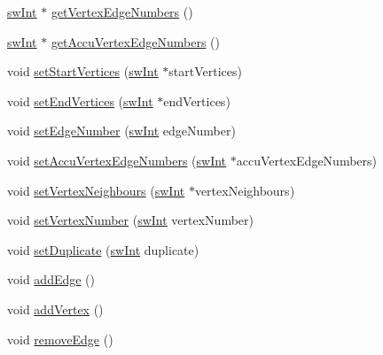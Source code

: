 \begin{DoxyCompactItemize}
\item 
\mbox{\hyperlink{include_2swMacro_8h_a113cf5f6b5377cdf3fac6aa4e443e9aa}{sw\+Int}} $\ast$ \mbox{\hyperlink{classUNAT_1_1Topology_a6838e39b330fa60923fb44e7f47a468d}{get\+Vertex\+Edge\+Numbers}} ()
\item 
\mbox{\hyperlink{include_2swMacro_8h_a113cf5f6b5377cdf3fac6aa4e443e9aa}{sw\+Int}} $\ast$ \mbox{\hyperlink{classUNAT_1_1Topology_a3d3981abcf81d997aa4631014eb4643e}{get\+Accu\+Vertex\+Edge\+Numbers}} ()
\item 
void \mbox{\hyperlink{classUNAT_1_1Topology_a59740da48119b1fe9cbc08ec61edd1c2}{set\+Start\+Vertices}} (\mbox{\hyperlink{include_2swMacro_8h_a113cf5f6b5377cdf3fac6aa4e443e9aa}{sw\+Int}} $\ast$start\+Vertices)
\item 
void \mbox{\hyperlink{classUNAT_1_1Topology_a238cee750b0467fe8d479b88f4cd2399}{set\+End\+Vertices}} (\mbox{\hyperlink{include_2swMacro_8h_a113cf5f6b5377cdf3fac6aa4e443e9aa}{sw\+Int}} $\ast$end\+Vertices)
\item 
void \mbox{\hyperlink{classUNAT_1_1Topology_aaf9838827f3d81110b6911a23fc28864}{set\+Edge\+Number}} (\mbox{\hyperlink{include_2swMacro_8h_a113cf5f6b5377cdf3fac6aa4e443e9aa}{sw\+Int}} edge\+Number)
\item 
void \mbox{\hyperlink{classUNAT_1_1Topology_a06ea506a220c6eb45a6beb4106aa0dbc}{set\+Accu\+Vertex\+Edge\+Numbers}} (\mbox{\hyperlink{include_2swMacro_8h_a113cf5f6b5377cdf3fac6aa4e443e9aa}{sw\+Int}} $\ast$accu\+Vertex\+Edge\+Numbers)
\item 
void \mbox{\hyperlink{classUNAT_1_1Topology_aa82494c4b097ebb30f323947c9f3161e}{set\+Vertex\+Neighbours}} (\mbox{\hyperlink{include_2swMacro_8h_a113cf5f6b5377cdf3fac6aa4e443e9aa}{sw\+Int}} $\ast$vertex\+Neighbours)
\item 
void \mbox{\hyperlink{classUNAT_1_1Topology_aeddafa74ad2dc0769cf5e0a3384a20ce}{set\+Vertex\+Number}} (\mbox{\hyperlink{include_2swMacro_8h_a113cf5f6b5377cdf3fac6aa4e443e9aa}{sw\+Int}} vertex\+Number)
\item 
void \mbox{\hyperlink{classUNAT_1_1Topology_a786790063b5399bb3bb8b6fc6761ca5a}{set\+Duplicate}} (\mbox{\hyperlink{include_2swMacro_8h_a113cf5f6b5377cdf3fac6aa4e443e9aa}{sw\+Int}} duplicate)
\item 
void \mbox{\hyperlink{classUNAT_1_1Topology_a6f341852613126c689a10a2785a08c55}{add\+Edge}} ()
\item 
void \mbox{\hyperlink{classUNAT_1_1Topology_adfc7a4148d5430ae7af6ed1d499875f7}{add\+Vertex}} ()
\item 
void \mbox{\hyperlink{classUNAT_1_1Topology_a359fdcc98879b6de79d9a9ea8221bc68}{remove\+Edge}} ()

\end{DoxyCompactItemize}
